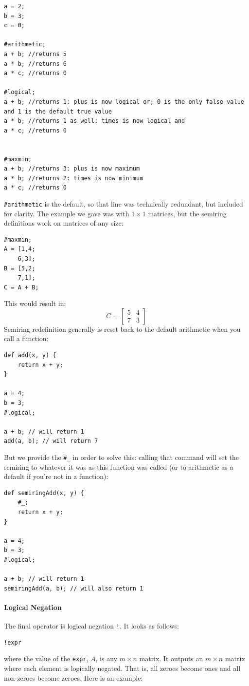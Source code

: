\begin{lstlisting}
a = 2;
b = 3;
c = 0;

#arithmetic;
a + b; //returns 5
a * b; //returns 6
a * c; //returns 0

#logical;
a + b; //returns 1: plus is now logical or; 0 is the only false value and 1 is the default true value
a * b; //returns 1 as well: times is now logical and
a * c; //returns 0


#maxmin;
a + b; //returns 3: plus is now maximum
a * b; //returns 2: times is now minimum
a * c; //returns 0
\end{lstlisting}

\verb=#arithmetic= is the default, so that line was technically redundant, but included for clarity.
The example we gave was with $1\times1$ matrices, but the semiring definitions work on matrices of any size:

\begin{lstlisting}
#maxmin;
A = [1,4;
    6,3];
B = [5,2;
    7,1];
C = A + B;
\end{lstlisting}
This would result in:
$$C=\begin{bmatrix}
5&4\\
7&3
\end{bmatrix}$$
Semiring redefinition generally is reset back to the default arithmetic when you call a function:
\begin{lstlisting}
def add(x, y) {
    return x + y;
}

a = 4;
b = 3;
#logical;

a + b; // will return 1
add(a, b); // will return 7
\end{lstlisting}
But we provide the \verb=#_= in order to solve this: calling that command will set the semiring to whatever it was as this function was called (or to arithmetic as a default if you're not in a function):
\begin{lstlisting}
def semiringAdd(x, y) {
    #_;
    return x + y;
}

a = 4;
b = 3;
#logical;

a + b; // will return 1
semiringAdd(a, b); // will also return 1
\end{lstlisting}

\paragraph{Logical Negation}
The final operator is logical negation \verb=!=.  It looks as follows:
\begin{lstlisting}
!expr
\end{lstlisting}
where the value of the \verb=expr=, $A$, is any $m \times n$ matrix.  It outputs an $m \times n$ matrix where each element is logically negated.  That is, all zeroes become ones and all non-zeroes become zeroes.  Here is an example:

